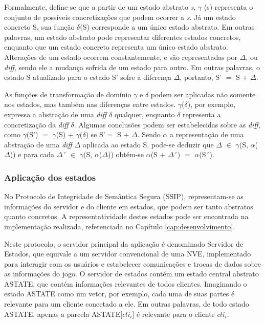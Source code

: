 Formalmente, define-se que a partir de um estado abstrato \textit{s}, $\gamma$ (s) representa o conjunto de possíveis concretizações que podem ocorrer a \textit{s}. Já um estado concreto S, sua função $\delta$(S) corresponde a um único estado abstrato. Em outras palavras, um estado abstrato pode representar diferentes estados concretos, enquanto que um estado concreto representa um único estado abstrato. Alterações de um estado ocorrem constantemente, e são representadas por $\Delta$, ou \textit{diff}, sendo ele a mudança sofrida de um estado para outro. Em outras palavras, o estado S atualizado para o estado S' sofre a diferença $\Delta$, portanto, S' $=$ S + $\Delta$. 

As funções de transformação de domínio $\gamma$ e $\delta$ podem ser aplicadas não somente nos estados, mas também nas diferenças entre estados. $\gamma$($\delta$), por exemplo, expressa a abstração de uma \textit{diff} $\delta$ qualquer, enquanto $\delta$ representa a concretização da \textit{diff} $\delta$. Algumas conclusões podem ser estabelecidas sobre as \textit{diff}, como $\gamma$(S') $=$ $\gamma$(S) + $\gamma$($\delta$) se S'$=$ S + $\Delta$. Sendo $\alpha$ a representação de uma abstração de uma \textit{diff} $\Delta$ aplicada ao estado S, pode-se deduzir que $\Delta$ $\in$ $\gamma$(S, $\alpha$($\Delta$)) e para cada $\Delta$´ $\in$ $\gamma$(S, $\alpha$($\Delta$)) obtém-se $\alpha$(S $+$ $\Delta$´) $=$ $\alpha$(S´).


\subsubsection{Aplicação dos estados}

No Protocolo de Integridade de Semântica Segura (SSIP), representam-se as informações do servidor e do cliente em estados, que podem ser tanto abstratos quanto concretos. A representatividade destes estados pode ser encontrada na implementação realizada, referenciada no Capítulo \ref{cap:desenvolvimento}. 

Neste protocolo, o servidor principal da aplicação é denominado Servidor de Estados, que equivale a um servidor convencional de uma NVE, implementado para interagir com os usuários e estabelecer comunicações e trocas de dados sobre as informações do jogo. O servidor de estados contém um estado central abstrato ASTATE, que contém informações relevantes de todos clientes. Imaginando o estado ASTATE como um vetor, por exemplo, cada uma de suas partes é relevante para um cliente conectado a ele. Em outras palavras, de todo estado ASTATE, apenas a parcela ASTATE[$cli_i$] é relevante para o cliente $cli_i$.

